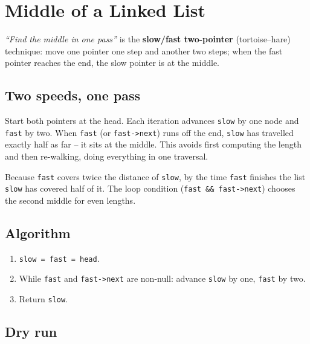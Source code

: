 \section{Middle of a Linked List}
\label{sec:ll-middle}


\begin{patternbox}
\emph{``Find the middle in one pass''} is the \textbf{slow/fast two-pointer}
(tortoise--hare) technique: move one pointer one step and another two steps;
when the fast pointer reaches the end, the slow pointer is at the middle.
\end{patternbox}

\subsection*{Two speeds, one pass}

Start both pointers at the head. Each iteration advances \texttt{slow} by
one node and \texttt{fast} by two. When \texttt{fast} (or
\texttt{fast->next}) runs off the end, \texttt{slow} has travelled exactly
half as far -- it sits at the middle. This avoids first computing the length
and then re-walking, doing everything in one traversal.

\begin{ideabox}
Because \texttt{fast} covers twice the distance of \texttt{slow}, by the
time \texttt{fast} finishes the list \texttt{slow} has covered half of it.
The loop condition (\texttt{fast \&\& fast->next}) chooses the second middle
for even lengths.
\end{ideabox}

\subsection*{Algorithm}

\begin{enumerate}
  \item \texttt{slow = fast = head}.
  \item While \texttt{fast} and \texttt{fast->next} are non-null: advance
        \texttt{slow} by one, \texttt{fast} by two.
  \item Return \texttt{slow}.
\end{enumerate}

\subsection*{Dry run}

